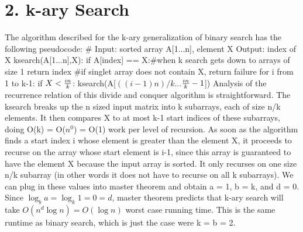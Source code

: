 \documentclass[11pt]{article}
\begin{document}
\newpage
\section*{2. k-ary Search}
The algorithm described for the k-ary generalization of binary search has the following pseudocode:\newline
\newline
\# Input: sorted array A[1...n], element X \indent Output: index of X\newline
ksearch(A[1...n],X):\newline
\indent if A[index] == X:\indent \#when k search gets down to arrays of size 1\newline
\indent \indent return index \indent \#if singlet array does not contain X, return failure\newline
\indent for i from 1 to k-1:\newline
\indent \indent if $X < {i n \over k}$:\newline
\indent \indent \indent ksearch(A[$((i-1)n) / k$...${i n \over k}-1$])\newline
\newline
Analysis of the recurrence relation of this divide and conquer algorithm is straightforward. The ksearch breaks up the n sized input matrix into k subarrays, each of size n/k elements. It then compares X to at most k-1 start indices of these subarrays, doing O(k) = O($n^0$) = O(1) work per level of recursion. As soon as the algorithm finds a start index i whose element is greater than the element X, it proceeds to recurse on the array whose start element is i-1, since this array is guaranteed to have the element X because the input array is sorted. It only recurses on one size n/k subarray (in other words it does not have to recurse on all k subarrays). We can plug in these values into master theorem and obtain a = 1, b = k, and d = 0. Since $\log_b a = \log_k 1 = 0 = d$, master theorem predicts that k-ary search will take $O(n^d\log n)=O(\log n)$ worst case running time. This is the same runtime as binary search, which is just the case were k = b = 2.


\newpage
\end{document}
